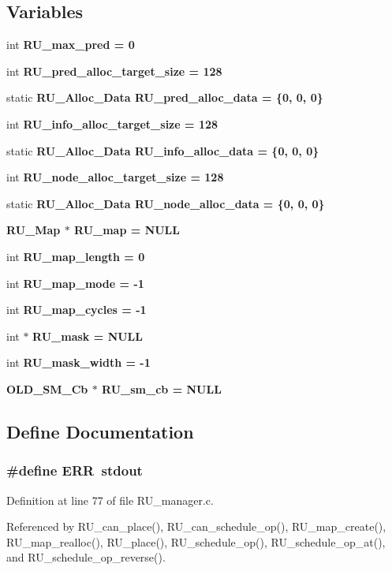 \subsection*{Variables}
\begin{CompactItemize}
\item 
int \bf{RU\_\-max\_\-pred} = 0
\item 
int \bf{RU\_\-pred\_\-alloc\_\-target\_\-size} = 128
\item 
static \bf{RU\_\-Alloc\_\-Data} \bf{RU\_\-pred\_\-alloc\_\-data} = \{0, 0, 0\}
\item 
int \bf{RU\_\-info\_\-alloc\_\-target\_\-size} = 128
\item 
static \bf{RU\_\-Alloc\_\-Data} \bf{RU\_\-info\_\-alloc\_\-data} = \{0, 0, 0\}
\item 
int \bf{RU\_\-node\_\-alloc\_\-target\_\-size} = 128
\item 
static \bf{RU\_\-Alloc\_\-Data} \bf{RU\_\-node\_\-alloc\_\-data} = \{0, 0, 0\}
\item 
\bf{RU\_\-Map} $\ast$ \bf{RU\_\-map} = \bf{NULL}
\item 
int \bf{RU\_\-map\_\-length} = 0
\item 
int \bf{RU\_\-map\_\-mode} = -1
\item 
int \bf{RU\_\-map\_\-cycles} = -1
\item 
int $\ast$ \bf{RU\_\-mask} = \bf{NULL}
\item 
int \bf{RU\_\-mask\_\-width} = -1
\item 
\bf{OLD\_\-SM\_\-Cb} $\ast$ \bf{RU\_\-sm\_\-cb} = \bf{NULL}
\end{CompactItemize}


\subsection{Define Documentation}
\subsubsection{\setlength{\rightskip}{0pt plus 5cm}\#define ERR~stdout}\label{RU__manager_8c_735563036dced0b7d6cc98f97ea4978b}




Definition at line 77 of file RU\_\-manager.c.

Referenced by RU\_\-can\_\-place(), RU\_\-can\_\-schedule\_\-op(), RU\_\-map\_\-create(), RU\_\-map\_\-realloc(), RU\_\-place(), RU\_\-schedule\_\-op(), RU\_\-schedule\_\-op\_\-at(), and RU\_\-schedule\_\-op\_\-reverse().

